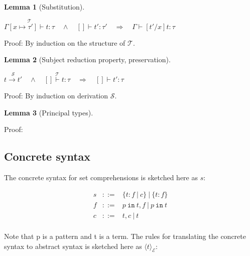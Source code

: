 \documentclass[a4paper]{article}
\newcommand{\pipe}{\ | \ }
\newcommand{\s}[1]{\mathtt{#1}}
\newcommand{\im}{\Rightarrow}
\newcommand{\step}{\to}
\newcommand{\T}{\mathcal{T}}
\renewcommand{\S}{\mathcal{S}}
\newcommand{\stackover}[2]{\stackrel{{#2}}{#1}}
\newcommand{\sugar}[2]{\langle#2\rangle_{\mathcal{#1}}}
\newcommand{\sug}[1]{\sugar{E}{#1}}
\newtheorem{lemma}{Lemma}[section]
\begin{document}
\begin{lemma}[Substitution] $ $
  \label{lemma:substitution}

$\stackover{\Gamma[x \mapsto \tau'] \vdash t: \tau}{\T} \quad \land \quad []\vdash t':\tau' \quad \im \quad
\Gamma \vdash [t'/x]t : \tau$
\end{lemma}

Proof: By induction on the structure of $\T$.


\begin{lemma}[Subject reduction property, preservation] $ $
  \label{lemma:preservation}

$\stackover{t \step t'}{\S} \quad \land \quad \stackover{[] \vdash t: \tau}{\T} \quad \im \quad [] \vdash t' : \tau$
\end{lemma}

Proof: By induction on derivation $\S$.


\begin{lemma}[Principal types] $ $
  \label{lemma:principalTypes}

\end{lemma}

Proof:

\subsection{Concrete syntax}

The concrete syntax for set comprehensions is sketched here as $s$:

\begin{eqnarray*}
s & ::= & \{ t : f \pipe c\} \pipe \{ t : f \}\\
f & ::= & p \s{\ in\ } t, f \pipe p \s{\ in\ } t\\
c & ::= & t, c \pipe t \\
\end{eqnarray*}

Note that p is a pattern and t is a term. The rules for translating
the concrete syntax to abstract syntax is sketched here as
$\sug{t}$:
\end{document}
